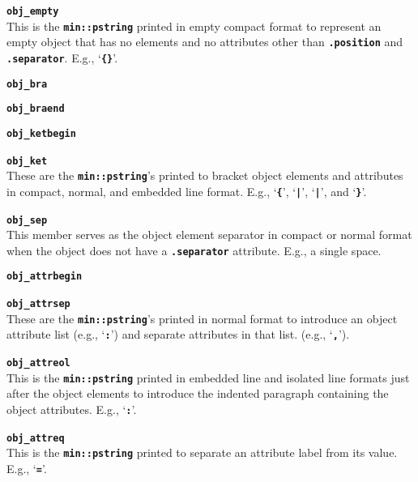 \documentclass[12pt]{article}
\makeatletter
\newcommand{\TT}[1]{{\tt \bfseries #1}}
\newcommand{\ttmkey}[2]{\TT{#1}\index{#1@{\tt #1}!#2}}
\newenvironment{itemlist}[1][1.2in]%
	{\begin{list}{}{\setlength{\labelwidth}{#1}%
		        \setlength{\leftmargin}{\labelwidth}%
		        \addtolength{\leftmargin}{+0.2in}%
		        \renewcommand{\makelabel}[1]{##1\hfill}}}%
	{\end{list}}
\makeatother
\begin{document}
\begin{itemlist}[0.2in]
\item[\ttmkey{obj\_empty}{in {\tt min::obj\_format}}]~\\
This is the \TT{min::pstring} printed in empty compact format
to represent an empty object that has no elements and no attributes
other than \TT{.position} and \TT{.separator}.  E.g., `\TT{\{\}}'.

\item[\ttmkey{obj\_bra}{in {\tt min::obj\_format}}]
\item[\ttmkey{obj\_braend}{in {\tt min::obj\_format}}]\vspace{-2ex}
\item[\ttmkey{obj\_ketbegin}{in {\tt min::obj\_format}}]\vspace{-2ex}
\item[\ttmkey{obj\_ket}{in {\tt min::obj\_format}}]\vspace{-2ex}~\\
These are the \TT{min::pstring}'s printed to bracket
object elements and attributes in compact, normal, and embedded line format.
E.g., `\TT{\{}', `\TT{|}', `\TT{|}', and `\TT{\}}'.

\item[\ttmkey{obj\_sep}{in {\tt min::obj\_format}}]~\\
This member serves as the object element separator in compact
or normal format when the object does
not have a \TT{.separator} attribute.  E.g., a single space.

\item[\ttmkey{obj\_attrbegin}{in {\tt min::obj\_format}}]
\item[\ttmkey{obj\_attrsep}{in {\tt min::obj\_format}}]\vspace{-2ex}~\\
These are the \TT{min::pstring}'s printed in normal format to introduce
an object attribute list (e.g., `\TT{:}')
and separate attributes in that list. (e.g., `\TT{,}').

\item[\ttmkey{obj\_attreol}{in {\tt min::obj\_format}}]~\\
This is the \TT{min::pstring} printed in embedded line and isolated line
formats just after the object elements
to introduce the indented paragraph containing the object attributes.
E.g., `\TT{:}'.

\item[\ttmkey{obj\_attreq}{in {\tt min::obj\_format}}]~\\
This is the \TT{min::pstring} printed to
separate an attribute label from its value.  E.g., `\TT{=}'.


\end{itemlist}
\end{document}
